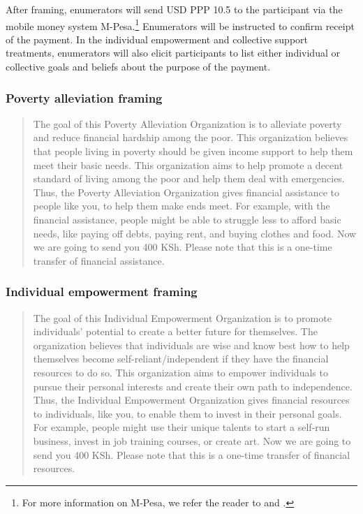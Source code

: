 \documentclass[11pt, a4paper]{article}\usepackage[]{graphicx}\usepackage[]{color}
\begin{document}
        After framing, enumerators will send USD PPP 10.5 to the participant via the mobile money system M-Pesa.\footnote{For more information on M-Pesa, we refer the reader to \textcite{jack_mobile_2011} and \textcite{mbiti_mobile_2011}.} Enumerators will be instructed to confirm receipt of the payment. In the individual empowerment and collective support treatments, enumerators will also elicit participants to list either individual or collective goals and beliefs about the purpose of the payment.

        \subsubsection{Poverty alleviation framing}

            \begin{quote}

                The goal of this Poverty Alleviation Organization is to alleviate poverty and reduce financial hardship among the poor. This organization believes that people living in poverty should be given income support to help them meet their basic needs. This organization aims to help promote a decent standard of living among the poor and help them deal with emergencies. Thus, the Poverty Alleviation Organization gives financial assistance to people like you, to help them make ends meet. For example, with the financial assistance, people might be able to struggle less to afford basic needs, like paying off debts, paying rent, and buying clothes and food. Now we are going to send you 400 KSh. Please note that this is a one-time transfer of financial assistance.

            \end{quote}

        \subsubsection{Individual empowerment framing}

            \begin{quote}

                The goal of this Individual Empowerment Organization is to promote individuals' potential to create a better future for themselves.  The organization believes that individuals are wise and know best how to help themselves become self-reliant/independent if they have the financial resources to do so. This organization aims to empower individuals to pursue their personal interests and create their own path to independence. Thus, the Individual Empowerment Organization gives financial resources to individuals, like you, to enable them to invest in their personal goals. For example, people might use their unique talents to start a self-run business, invest in job training courses, or create art. Now we are going to send you 400 KSh. Please note that this is a one-time transfer of financial resources.

            \end{quote}
\end{document}
